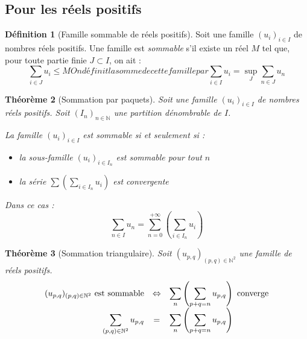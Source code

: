 \documentclass[11pt,a4paper]{report}
\newtheorem{theorem}{Théorème}[chapter]
\theoremstyle{definition}
\newtheorem{dfn}[theorem]{Définition}
\begin{document}
\subsection{Pour les réels positifs} %
\label{sub:pour_les_reels_positifs}
\begin{dfn}[Famille sommable de réels positifs]
     Soit une famille $(u_i)_{i\in I}$ de nombres réels positifs. Une famille est \emph{sommable} s'il existe un réel $M$ tel que, pour toute partie finie $J \subset I $, on ait :
     \begin{subequations}
     \begin{equation}
     \sum_{i \in J} u_i \le M
     \end{equation}
     On définit la somme de cette famille par
     \begin{equation}
     \sum_{i\in I} u_i = \sup_J \sum_{n\in J} u_n
     \end{equation}
     \end{subequations}
\end{dfn}
\begin{theorem}[Sommation par paquets]
     Soit une famille $(u_i)_{i\in I}$ de nombres réels positifs.\newline
     Soit $(I_n)_{n\in\mathbb{N}}$ une partition \emph{dénombrable} de $I$.\par
     La famille $(u_i)_{i\in I}$ est sommable \emph{si et seulement si} :
     \begin{itemize}
         \item la sous-famille $(u_i)_{i\in I_n}$ est sommable pour tout $n$
         \item la série $\sum \left( \sum_{i\in I_n} u_i \right)$ est convergente
     \end{itemize}
     Dans ce cas : 
     \begin{equation}
     \sum_{n\in I} u_n = \sum_{n=0}^{+\infty} \left( \sum_{i\in I_n} u_i \right)
     \end{equation}
\end{theorem}
\begin{theorem}[Sommation triangulaire]
     Soit $(u_{p,q})_{(p,q)\in \mathbb{N}^2}$ une famille de réels positifs.\newline
     \begin{equation}
          \begin{array}{r c l}
               (u_{p,q})_{(p,q)\in \mathbb{N}^2} \text{ est sommable} & \Leftrightarrow & \displaystyle\sum_n \left( \displaystyle\sum_{p+q = n} u_{p,q} \right)\text{ converge} \\
               \displaystyle\sum_{(p,q)\in \mathbb{N}^2} u_{p,q} & = & \displaystyle\sum_n \left( \displaystyle\sum_{p+q = n} u_{p,q} \right) \\
          \end{array}
     \end{equation}
\end{theorem}
\end{document}
